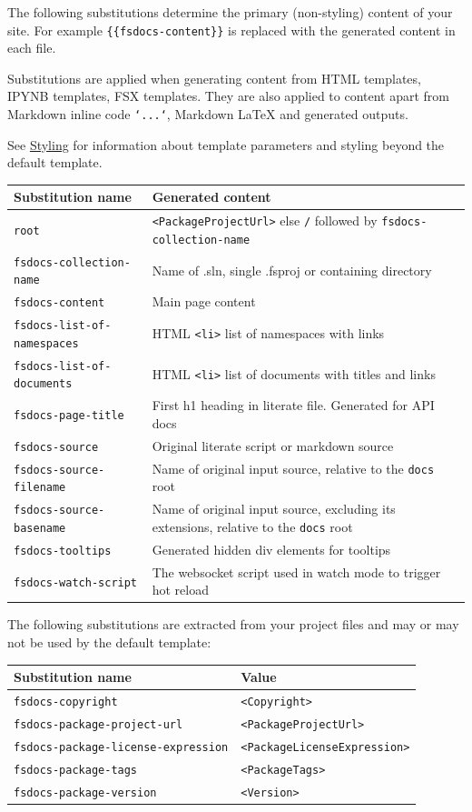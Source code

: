 \documentclass{article}
\begin{document}
The following substitutions determine the primary (non-styling) content of your site.
For example \texttt{\{\{fsdocs-content\}\}} is replaced with the generated content in each file.


Substitutions are applied when generating content from HTML templates, IPYNB templates, FSX templates.
They are also applied to content apart from Markdown inline code \texttt{`...`}, Markdown LaTeX and
generated outputs.


See \href{styling.html}{Styling} for information about template parameters and styling beyond the default template.
\begin{tabular}{|l|l|}\hline
\textbf{Substitution name} & \textbf{Generated content}\\ \hline\hline
\texttt{root} & \texttt{<PackageProjectUrl>} else \texttt{/} followed by \texttt{fsdocs-collection-name}\\ \hline
\texttt{fsdocs-collection-name} & Name of .sln, single .fsproj or containing directory\\ \hline
\texttt{fsdocs-content} & Main page content\\ \hline
\texttt{fsdocs-list-of-namespaces} & HTML \texttt{<li>} list of namespaces with links\\ \hline
\texttt{fsdocs-list-of-documents} & HTML \texttt{<li>} list of documents with  titles and links\\ \hline
\texttt{fsdocs-page-title} & First h1 heading in literate file. Generated for API docs\\ \hline
\texttt{fsdocs-source} & Original literate script or markdown source\\ \hline
\texttt{fsdocs-source-filename} & Name of original input source, relative to the \texttt{docs} root\\ \hline
\texttt{fsdocs-source-basename} & Name of original input source, excluding its extensions, relative to the \texttt{docs} root\\ \hline
\texttt{fsdocs-tooltips} & Generated hidden div elements for tooltips\\ \hline
\texttt{fsdocs-watch-script} & The websocket script used in watch mode to trigger hot reload\\ \hline
\end{tabular}



The following substitutions are extracted from your project files and may or may not be used by the default
template:
\begin{tabular}{|l|l|}\hline
\textbf{Substitution name} & \textbf{Value}\\ \hline\hline
\texttt{fsdocs-copyright} & \texttt{<Copyright>}\\ \hline
\texttt{fsdocs-package-project-url} & \texttt{<PackageProjectUrl>}\\ \hline
\texttt{fsdocs-package-license-expression} & \texttt{<PackageLicenseExpression>}\\ \hline
\texttt{fsdocs-package-tags} & \texttt{<PackageTags>}\\ \hline
\texttt{fsdocs-package-version} & \texttt{<Version>}\\ \hline
\end{tabular}
\end{document}
